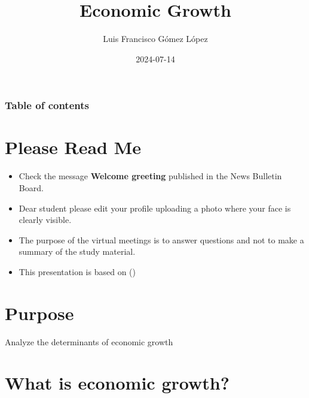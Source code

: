 \documentclass[
  ignorenonframetext,
]{beamer}
\title{Economic Growth}
\author{Luis Francisco Gómez López}
\date{2024-07-14}
\institute{FAEDIS}
\renewcommand*\contentsname{Table of contents}
\newcommand\contentsname{Table of contents}
\begin{document}
\frame{\titlepage}

\renewcommand*\contentsname{Table of contents}
\begin{frame}[allowframebreaks]
  \frametitle{Table of contents}
  \tableofcontents[hideallsubsections]
\end{frame}

\section{Please Read Me}\label{please-read-me}

\begin{frame}{}
\label{section}
\begin{itemize}
\item
  Check the message \textbf{Welcome greeting} published in the News
  Bulletin Board.
\item
  Dear student please edit your profile uploading a photo where your
  face is clearly visible.
\item
  The purpose of the virtual meetings is to answer questions and not to
  make a summary of the study material.
\item
  This presentation is based on
  ()
\end{itemize}
\end{frame}

\section{Purpose}\label{purpose}

\begin{frame}{}
\label{section-1}
Analyze the determinants of economic growth
\end{frame}

\section{What is economic growth?}\label{what-is-economic-growth}
\end{document}

